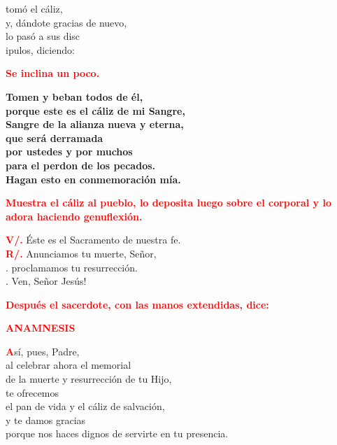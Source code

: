 \documentclass[12pt, letterpaper, spanish]{report}
\begin{document}
\Large tom\'o el c\'aliz,\\
y, d\'andote gracias de nuevo,\\
lo pas\'o a sus disc\\ipulos, diciendo:\newline

\large{\bfseries \textcolor{red}{Se inclina un poco.}}\newline

\LARGE{ \bfseries{ Tomen y beban todos de \'el,\\
porque este es el c\'aliz de mi Sangre,\\
Sangre de la alianza nueva y eterna,\\
que ser\'a derramada\\
por ustedes y por muchos\\
para el perdon de los pecados.\\
Hagan esto en conmemoraci\'on m\'ia.}}\newline

\large{\bfseries \textcolor{red}{Muestra el c\'aliz al pueblo, lo deposita luego sobre el corporal y lo adora haciendo genuflexi\'on.}} \newline

\Large \hspace{-0.9cm} {\bfseries \textcolor{red}{V/.}} \hspace{0.5cm} \'Este es el Sacramento de nuestra fe.\\
\Large \hspace{-0.9cm} {\bfseries \textcolor{red}{R/.}} \hspace{0.5cm} Anunciamos tu muerte, Se\~nor,\\
.\hspace{1.5cm} proclamamos tu resurrecci\'on.\\
.\hspace{1.5cm} Ven, Se\~nor Jes\'us!\newline

\large{\bfseries \textcolor{red}{Despu\'es el sacerdote, con las manos extendidas, dice:}}\newline

\Large {\bfseries \textcolor{red}{ANAMNESIS}}

\Large \lettrine[lines=1]{\bfseries \textcolor{red}{A}}{}s\'i, pues, Padre,\\
al celebrar ahora el memorial\\
de la muerte y resurrecci\'on de tu Hijo,\\
te ofrecemos\\
el pan de vida y el c\'aliz de salvaci\'on,\\
y te damos gracias\\
porque nos haces dignos de servirte en tu presencia.
\end{document}
